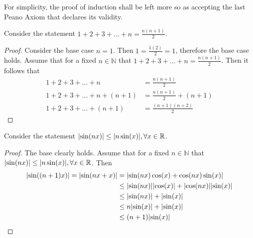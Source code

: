 \documentclass[../notes.tex]{subfiles}
\begin{document}
For simplicity, the proof of induction shall be left more so as accepting the last Peano Axiom that declares its validity.

\begin{example}
    Consider the statement $1 + 2 + 3 + \ldots + n = \frac{n(n+1)}{2}$.
    \begin{proof}
        Consider the base case $n = 1$. Then $1 = \frac{1(2)}{2} = 1$, therefore the base case holds. Assume that for a fixed $n \in \mathbb{N}$ that $1 + 2 + 3 + \ldots + n = \frac{n(n+1)}{2}$. Then it follows that
        \begin{align*}
            1 + 2 + 3 + \ldots + n &= \frac{n(n+1)}{2} \\
            1 + 2 + 3 + \ldots + n + (n+1) &= \frac{n(n+1)}{2} + (n+1) \\
            1 + 2 + 3 + \ldots + (n+1) &= \frac{(n+1)(n+2)}{2}
        \end{align*}
    \end{proof}
\end{example}

\begin{example}
    Consider the statement $\abs{\sin(nx)} \leq \abs{n\sin(x)}, \forall x \in \mathbb{R}$.
    \begin{proof}
        The base clearly holds. Assume that for a fixed $n \in \mathbb{N}$ that $\abs{\sin(nx)} \leq \abs{n\sin(x)}, \forall x \in \mathbb{R}$. Then
        \begin{align*}
            \abs{\sin((n+1)x)} = \abs{\sin(nx + x)} &= \abs{\sin(nx) \cos(x) + \cos(nx) \sin(x)} \\
                                                    &\leq \abs{\sin(nx)}\abs{\cos(x)} + \abs{\cos(nx)}\abs{\sin(x)} \\
                                                    &\leq \abs{\sin(nx)} + \abs{\sin(x)} \\
                                                    &\leq n\abs{\sin(x)} + \abs{\sin(x)} \\
                                                    &\leq (n+1)\abs{\sin(x)}
        \end{align*}
    \end{proof}
\end{example}
\end{document}
